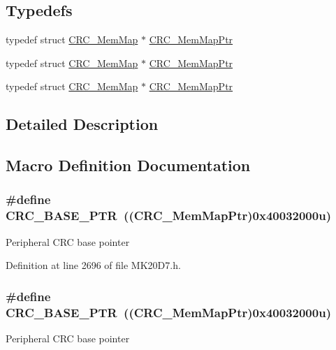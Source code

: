 \subsection*{Typedefs}
\begin{DoxyCompactItemize}
\item 
typedef struct \hyperlink{struct_c_r_c___mem_map}{C\+R\+C\+\_\+\+Mem\+Map} $\ast$ \hyperlink{group___c_r_c___peripheral_ga65ec00368ee39504a8a83cd736901b84}{C\+R\+C\+\_\+\+Mem\+Map\+Ptr}
\item 
typedef struct \hyperlink{struct_c_r_c___mem_map}{C\+R\+C\+\_\+\+Mem\+Map} $\ast$ \hyperlink{group___c_r_c___peripheral_ga65ec00368ee39504a8a83cd736901b84}{C\+R\+C\+\_\+\+Mem\+Map\+Ptr}
\item 
typedef struct \hyperlink{struct_c_r_c___mem_map}{C\+R\+C\+\_\+\+Mem\+Map} $\ast$ \hyperlink{group___c_r_c___peripheral_ga65ec00368ee39504a8a83cd736901b84}{C\+R\+C\+\_\+\+Mem\+Map\+Ptr}
\end{DoxyCompactItemize}


\subsection{Detailed Description}


\subsection{Macro Definition Documentation}
\subsubsection[{\texorpdfstring{C\+R\+C\+\_\+\+B\+A\+S\+E\+\_\+\+P\+TR}{CRC_BASE_PTR}}]{\setlength{\rightskip}{0pt plus 5cm}\#define C\+R\+C\+\_\+\+B\+A\+S\+E\+\_\+\+P\+TR~(({\bf C\+R\+C\+\_\+\+Mem\+Map\+Ptr})0x40032000u)}\hypertarget{group___c_r_c___peripheral_ga139bd4056b9e3c7987d28b6e955b662d}{}\label{group___c_r_c___peripheral_ga139bd4056b9e3c7987d28b6e955b662d}
Peripheral C\+RC base pointer 

Definition at line 2696 of file M\+K20\+D7.\+h.

\subsubsection[{\texorpdfstring{C\+R\+C\+\_\+\+B\+A\+S\+E\+\_\+\+P\+TR}{CRC_BASE_PTR}}]{\setlength{\rightskip}{0pt plus 5cm}\#define C\+R\+C\+\_\+\+B\+A\+S\+E\+\_\+\+P\+TR~(({\bf C\+R\+C\+\_\+\+Mem\+Map\+Ptr})0x40032000u)}\hypertarget{group___c_r_c___peripheral_ga139bd4056b9e3c7987d28b6e955b662d}{}\label{group___c_r_c___peripheral_ga139bd4056b9e3c7987d28b6e955b662d}
Peripheral C\+RC base pointer 

